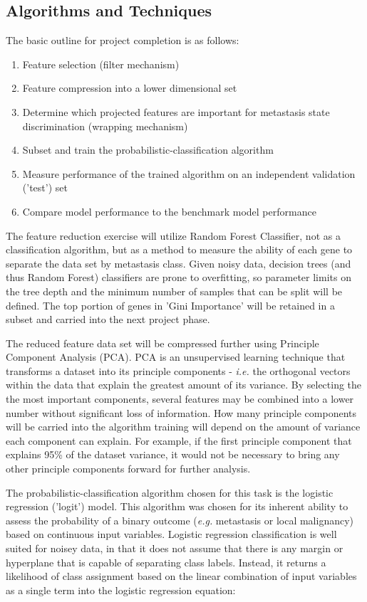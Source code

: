 \documentclass[final]{article}
\begin{document}
\subsection{Algorithms and Techniques}

The basic outline for project completion is as follows:
\begin{enumerate}
\item Feature selection (filter mechanism)
\item Feature compression into a lower dimensional set
\item Determine which projected features are important for metastasis state discrimination (wrapping mechanism)
\item Subset and train the probabilistic-classification algorithm
\item Measure performance of the trained algorithm on an independent validation ('test') set
\item Compare model performance to the benchmark model performance
\end{enumerate}

The feature reduction exercise will utilize Random Forest Classifier, not as a
classification algorithm, but as a method to measure the ability of each gene to
separate the data set by metastasis class.  Given noisy data, decision trees (and
thus Random Forest) classifiers are prone to overfitting, so parameter limits on
the tree depth and the minimum number of samples that can be split will be defined.
The top portion of genes in 'Gini Importance' will be retained in a subset and carried
into the next project phase.

The reduced feature data set will be compressed further using Principle Component
Analysis (PCA).  PCA is an unsupervised learning technique that transforms a
dataset into its principle components - \textit{i.e.} the orthogonal vectors within the
data that explain the greatest amount of its variance.  By selecting the
the most important components, several features may be combined into a lower
number without significant loss of information.  How many principle components
will be carried into the algorithm training will depend on the amount of variance
each component can explain.  For example, if the first principle component that
explains 95\% of the dataset variance, it would not be necessary to bring any other
principle components forward for further analysis.

The probabilistic-classification algorithm chosen for this task is the logistic
regression ('logit') model.  This algorithm was chosen for its inherent ability
to assess the probability of a binary outcome (\textit{e.g.} metastasis or local
malignancy) based on continuous input variables.  Logistic regression classification is well suited
for noisey data, in that it does not assume that there is any margin or hyperplane that
is capable of separating class labels.  Instead, it returns a likelihood of class assignment
based on the linear combination of input variables as a single term into the logistic
regression equation:
\end{document}
